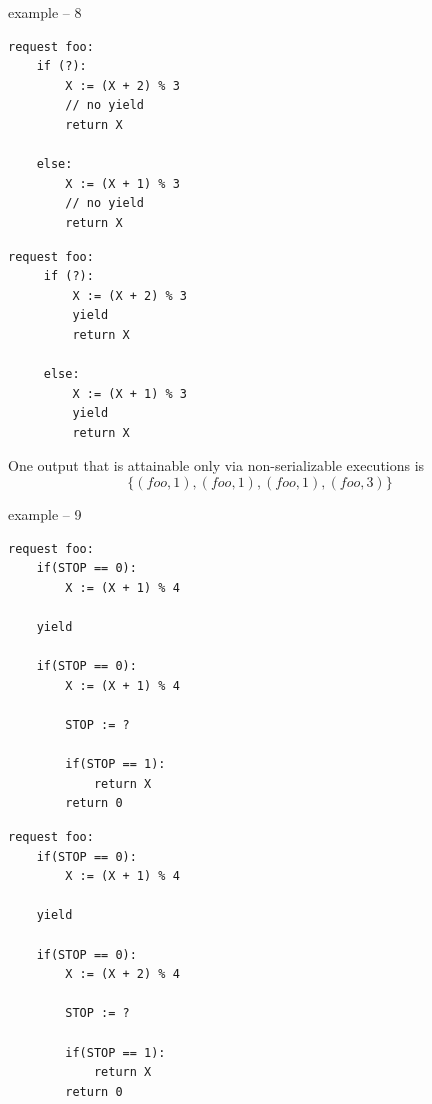 example – 8

\noindent
\begin{minipage}[t]{0.45\textwidth}
	\begin{lstlisting}[caption={foo (serializable)}]
request foo: 
    if (?):
        X := (X + 2) % 3 
        // no yield
        return X

    else:
        X := (X + 1) % 3
        // no yield
        return X
	\end{lstlisting}
\end{minipage}
\hfill
\begin{minipage}[t]{0.45\textwidth}
\begin{lstlisting}[caption={foo (non serializable)}]
request foo: 
     if (?):
         X := (X + 2) % 3 
         yield
         return X

     else:
         X := (X + 1) % 3
         yield
         return X
	\end{lstlisting}
\end{minipage}

One output that is attainable only via non-serializable executions is 
\[
\{(foo,1),(foo,1),(foo,1),(foo,3)\}
\]


\newpage


example – 9

\noindent
\begin{minipage}[t]{0.45\textwidth}
	\begin{lstlisting}[caption={foo (serializable)}]
request foo:
    if(STOP == 0):
        X := (X + 1) % 4

    yield

    if(STOP == 0):
        X := (X + 1) % 4

        STOP := ?
        
        if(STOP == 1):
	        return X
        return 0
	\end{lstlisting}
\end{minipage}
\hfill
\begin{minipage}[t]{0.45\textwidth}
	\begin{lstlisting}[caption={foo (non serializable)}]
request foo:
    if(STOP == 0):
        X := (X + 1) % 4

    yield

    if(STOP == 0):
        X := (X + 2) % 4

        STOP := ?
        
        if(STOP == 1):
	        return X
        return 0
	\end{lstlisting}
\end{minipage}




\newpage